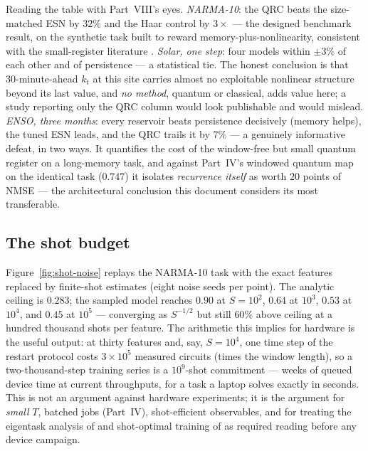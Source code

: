 Reading the table with Part~VIII's eyes. \emph{NARMA-10}: the QRC beats the
size-matched ESN by $32\%$ and the Haar control by $3\times$ --- the designed
benchmark result, on the synthetic task built to reward
memory-plus-nonlinearity, consistent with the small-register literature
\citep{fujii2017harnessing,kutvonen2020optimizing}. \emph{Solar, one step}:
four models within $\pm3\%$ of each other and of persistence --- a statistical
tie. The honest conclusion is that 30-minute-ahead $k_t$ at this site
carries almost no exploitable nonlinear structure beyond its last value, and
\emph{no method}, quantum or classical, adds value here; a study reporting
only the QRC column would look publishable and would mislead.
\emph{ENSO, three months}: every reservoir beats persistence decisively
(memory helps), the tuned ESN leads, and the QRC trails it by $7\%$ --- a
genuinely informative defeat, in two ways. It quantifies the cost of the
window-free but small quantum register on a long-memory task, and against
Part~IV's windowed quantum map on the identical task ($0.747$) it isolates
\emph{recurrence itself} as worth $20$ points of NMSE --- the architectural
conclusion this document considers its most transferable.

\subsection{The shot budget}
\label{sec:shot-budget}

Figure~\ref{fig:shot-noise} replays the NARMA-10 task with the exact
features replaced by finite-shot estimates (eight noise seeds per point).
The analytic ceiling is $0.283$; the sampled model reaches $0.90$ at
$S=10^2$, $0.64$ at $10^3$, $0.53$ at $10^4$, and $0.45$ at $10^5$ ---
converging as $S^{-1/2}$ but still $60\%$ above ceiling at a hundred
thousand shots per feature. The arithmetic this implies for hardware is the
useful output: at thirty features and, say, $S=10^4$, one time step of the
restart protocol costs $3\times10^5$ measured circuits (times the window
length), so a two-thousand-step training series is a $10^9$-shot
commitment --- weeks of queued device time at current throughputs, for a task
a laptop solves exactly in seconds. This is not an argument against hardware
experiments; it is the argument for \emph{small} $T$, batched jobs
(Part~IV), shot-efficient observables, and for treating the eigentask
analysis of \citet{hu2023tackling} and shot-optimal training of
\citet{ahmed2025optimal} as required reading before any device campaign.

